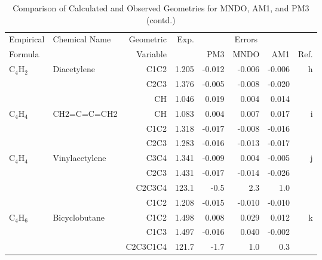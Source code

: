 \begin{table}
\caption{\label{geotabb}Comparison of Calculated and Observed Geometries for 
MNDO, AM1, and PM3 (contd.)}
\begin{center}
\compresstable
\begin{tabular}{llrrrrrr}
 Empirical  & Chemical Name &  Geometric &  Exp. & \multicolumn{3}{c}{Errors} & \\
  Formula   &               &  Variable &        & PM3  & MNDO  &  AM1 & Ref.\\
\hline
 C$_4$H$_2$        & Diacetylene                        &C1C2          &     1.205   &    -0.012 &    -0.006 &    -0.006 &     h \\
             &                                    &C2C3          &     1.376   &    -0.005 &    -0.008 &    -0.020 &       \\
             &                                    &CH            &     1.046   &     0.019 &     0.004 &     0.014 &       \\
 C$_4$H$_4$        & CH2=C=C=CH2                        &CH            &     1.083   &     0.004 &     0.007 &     0.017 &     i \\
             &                                    &C1C2          &     1.318   &    -0.017 &    -0.008 &    -0.016 &       \\
             &                                    &C2C3          &     1.283   &    -0.016 &    -0.013 &    -0.017 &       \\
 C$_4$H$_4$        & Vinylacetylene                     &C3C4          &     1.341   &    -0.009 &     0.004 &    -0.005 &     j \\
             &                                    &C2C3          &     1.431   &    -0.017 &    -0.014 &    -0.026 &       \\
             &                                    &C2C3C4      &     123.1   &      -0.5 &       2.3 &       1.0   &       \\
             &                                    &C1C2          &     1.208   &    -0.015 &    -0.010 &    -0.010 &       \\
 C$_4$H$_6$        & Bicyclobutane                      &C1C2          &     1.498   &     0.008 &     0.029 &     0.012 &     k \\
             &                                    &C1C3          &     1.497   &    -0.016 &     0.040 &    -0.002 &       \\
             &                                    &C2C3C1C4    &     121.7   &      -1.7 &       1.0 &       0.3   &       \\

\end{tabular}
\end{center}
\end{table}
